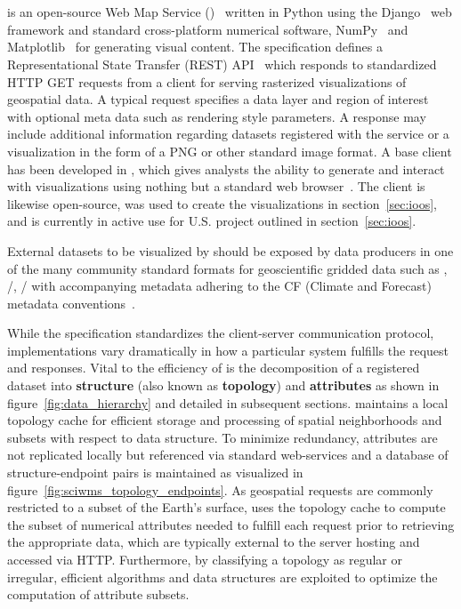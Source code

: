 \section{\sciwms{}}
\label{sec:sciwms}
\Sciwms{} is an open-source Web Map Service (\wms{})~\cite{wms14}
written in Python using the Django~\cite{django} web framework and
standard cross-platform numerical software, NumPy~\cite{numpy11} and
Matplotlib~\cite{hunter07} for generating visual content. The \wms{}
specification defines a Representational State Transfer (REST)
API~\cite{Fielding02} which responds to standardized HTTP GET requests
from a \wms{} client for serving rasterized visualizations of
geospatial data. A typical \wms{} request specifies a data layer and
region of interest with optional meta data such as rendering style
parameters. A \wms{} response may include additional information
regarding datasets registered with the service or a visualization in
the form of a PNG or other standard image format. A base \wms{} client
has been developed in \javascript{}, which gives analysts the ability
to generate and interact with visualizations using nothing but a
standard web browser~\cite{comtui}.  The \wms{} client is likewise
open-source, was used to create the visualizations in
section~\ref{sec:ioos}, and is currently in active use for
U.S. \ioos{} \comt{} project outlined in section~\ref{sec:ioos}.

External datasets to be visualized by \sciwms{} should be exposed by
data producers in one of the many community standard formats for
geoscientific gridded data such as \netcdf{}, \hdf{}/,
\grib{}/ with accompanying metadata adhering to the CF (Climate
and Forecast) metadata conventions~\cite{cf}. 

While the \ogc{} \wms{} specification standardizes the client-server
communication protocol, implementations vary dramatically in
how a particular system fulfills the \wms{} request and
responses. Vital to the efficiency of \sciwms{} is the decomposition
of a registered dataset into \textbf{structure} (also known as
\textbf{topology}) and \textbf{attributes} as shown in
figure~\ref{fig:data_hierarchy} and detailed in subsequent
sections. \Sciwms{} maintains a local topology cache for efficient
storage and processing of spatial neighborhoods and subsets with
respect to data structure. To minimize redundancy, attributes are not
replicated locally but referenced via standard web-services and a
database of structure-endpoint pairs is maintained as visualized in
figure~\ref{fig:sciwms_topology_endpoints}. As geospatial \wms{}
requests are commonly restricted to a subset of the Earth's surface,
\sciwms{} uses the topology cache to compute the subset of numerical
attributes needed to fulfill each request prior to retrieving the
appropriate data, which are typically external to the server hosting
\sciwms{} and accessed via HTTP. Furthermore, by classifying a
topology as regular or irregular, efficient algorithms and data
structures are exploited to optimize the computation of attribute
subsets.
